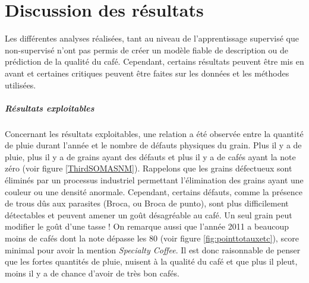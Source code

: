 \chapter{Discussion des résultats}










Les différentes analyses réalisées, tant au niveau de l'apprentissage supervisé que non-supervisé n'ont pas permis de créer un modèle fiable de description ou de prédiction de la qualité du café. Cependant, certains résultats peuvent être mis en avant et certaines critiques peuvent être faites sur les données et les méthodes utilisées. \\

\paragraph{Résultats exploitables} Concernant les résultats exploitables, une relation a été observée entre la quantité de pluie durant l'année et le nombre de défauts physiques du grain. Plus il y a de pluie, plus il y a de grains ayant des défauts et plus il y a de cafés ayant la note zéro (voir figure \ref{ThirdSOMASNM}). Rappelons que les grains défectueux sont éliminés par un processus industriel permettant l'élimination des grains ayant une couleur ou une densité anormale. Cependant, certains défauts, comme la présence de trous dûs aux parasites (Broca, ou Broca de punto), sont plus difficilement détectables et peuvent amener un goût désagréable au café. Un seul grain peut modifier le goût d'une tasse ! On remarque aussi que l'année 2011 a beaucoup moins de cafés dont la note dépasse les 80 (voir figure \ref{fig:pointtotauxetc}), score minimal pour avoir la mention \textit{Specialty Coffee}. Il est donc raisonnable de penser que les fortes quantités de pluie, nuisent à la qualité du café et que plus il pleut, moins il y a de chance d'avoir de très bon cafés.  \\



